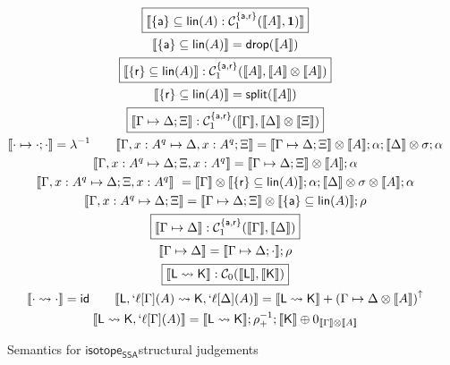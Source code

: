 \documentclass[acmsmall,screen,review]{acmart}
\newcommand{\mc}[1]{\ensuremath{\mathcal{#1}}}
\newcommand{\mb}[1]{\ensuremath{\mathbf{#1}}}
\newcommand{\ms}[1]{\ensuremath{\mathsf{#1}}}
\newcommand{\lbl}[1]{{`#1}}
\newcommand{\csplits}[3]{#1 \mapsto #2;#3}
\newcommand{\cwk}[2]{#1 \mapsto #2}
\newcommand{\lwk}[2]{#1 \rightsquigarrow #2}
\newcommand{\tlin}[2]{#2 \subseteq \ms{lin}(#1)}
\newcommand{\thyp}[3]{#1: {#2}^{#3}}
\newcommand{\lhyp}[3]{#1[#2](#3)}
\newcommand{\llhyp}[3]{\lhyp{\lbl{#1}}{#2}{#3}}
\newcommand{\taff}{{\{\ms{a}\}}}
\newcommand{\trel}{{\{\ms{r}\}}}
\newcommand{\tint}{{\{\ms{a}, \ms{r}\}}}
\newcommand{\dnt}[1]{\llbracket{#1}\rrbracket}
\newcommand{\upg}[2]{{#1}^{\uparrow #2}}
\newcommand{\isotopessa}{\ms{isotope_{SSA}}}
\begin{document}
\begin{figure}
  \begin{gather*}
    \boxed{\dnt{\tlin{A}{\taff}: \mc{C}_1^\tint(\dnt{A}, \mb{1})}}
      \\
      \dnt{\tlin{A}{\taff}} = \ms{drop}(\dnt{A})
      \\
    \boxed{\dnt{\tlin{A}{\trel}}
      : \mc{C}_1^\tint(\dnt{A}, \dnt{A} \otimes \dnt{A})}
      \\
      \dnt{\tlin{A}{\trel}} = \ms{split}(\dnt{A})
      \\
    \boxed{\dnt{\csplits{\Gamma}{\Delta}{\Xi}}
      : \mc{C}_1^\tint(\dnt{\Gamma}, \dnt{\Delta} \otimes \dnt{\Xi})}
      \\
    \dnt{\csplits{\cdot}{\cdot}{\cdot}} = \lambda^{-1} \qquad
    \dnt{\csplits
      {\Gamma, \thyp{x}{A}{q}}
      {\Delta, \thyp{x}{A}{q}}
      {\Xi}} 
      = \dnt{\csplits{\Gamma}{\Delta}{\Xi}} \otimes \dnt{A};\alpha;\dnt{\Delta} \otimes \sigma;\alpha 
      \\
    \dnt{\csplits
      {\Gamma, \thyp{x}{A}{q}}
      {\Delta}
      {\Xi, \thyp{x}{A}{q}}} 
      = \dnt{\csplits{\Gamma}{\Delta}{\Xi}} \otimes \dnt{A};\alpha 
      \\
    \dnt{\csplits
      {\Gamma, \thyp{x}{A}{q}}
      {\Delta}
      {\Xi, \thyp{x}{A}{q}}} \
      = \dnt{\Gamma} \otimes \dnt{\tlin{A}{\trel}};
        \alpha;
        \dnt{\Delta} \otimes \sigma \otimes \dnt{A};
        \alpha 
        \\
    \dnt{\csplits
      {\Gamma, \thyp{x}{A}{q}}
      {\Delta}
      {\Xi}}
      = \dnt{\csplits{\Gamma}{\Delta}{\Xi}}
        \otimes \dnt{\tlin{A}{\taff}}
      ; \rho 
      \\
    \boxed{\dnt{\cwk{\Gamma}{\Delta}}
      : \mc{C}_1^\tint(\dnt{\Gamma}, \dnt{\Delta})} 
      \\
      \dnt{\cwk{\Gamma}{\Delta}} 
      = \dnt{\csplits{\Gamma}{\Delta}{\cdot}};\rho 
      \\
    \boxed{\dnt{\lwk{\ms{L}}{\ms{K}}}
      : \mc{C}_0(\dnt{\ms{L}}, \dnt{\ms{K}})} 
      \\
    \dnt{\lwk{\cdot}{\cdot}} = \ms{id} \qquad
    \dnt{\lwk
      {\ms{L}, \llhyp{\ell}{\Gamma}{A}}
      {\ms{K}, \llhyp{\ell}{\Delta}{A}}}
      = \dnt{\lwk{\ms{L}}{\ms{K}}} + \upg{(\cwk{\Gamma}{\Delta} \otimes \dnt{A})}{} 
      \\
    \dnt{\lwk{\ms{L}}{\ms{K}, \llhyp{\ell}{\Gamma}{A}}}
      = \dnt{\lwk{\ms{L}}{\ms{K}}};\rho_+^{-1}
      ; \dnt{\ms{K}} \oplus 0_{\dnt{\Gamma} \otimes \dnt{A}}
  \end{gather*}
  \caption{Semantics for \isotopessa structural judgements}
  \label{fig:ssa-structural-semantics}
\end{figure}
\end{document}
